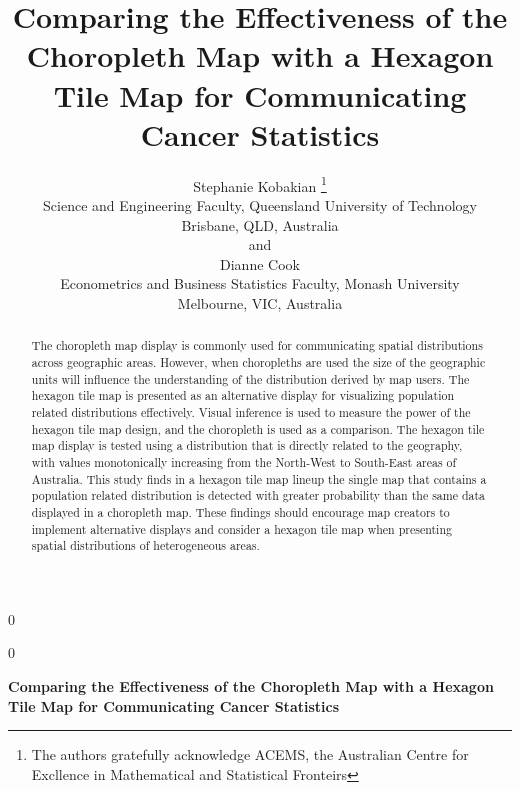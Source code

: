 \documentclass[12pt]{article}
\newcommand{\blind}{0}
\begin{document}
\def\spacingset#1{\renewcommand{\baselinestretch}%
{#1}\small\normalsize} \spacingset{1}



\blind
{
  \title{\bf Comparing the Effectiveness of the Choropleth Map with a
Hexagon Tile Map for Communicating Cancer Statistics}

  \author{
        Stephanie Kobakian \thanks{The authors gratefully acknowledge
ACEMS, the Australian Centre for Excllence in Mathematical and
Statistical Fronteirs} \\
    Science and Engineering Faculty, Queensland University of
Technology\\
Brisbane, QLD, Australia\\
     and \\     Dianne Cook \\
    Econometrics and Business Statistics Faculty, Monash University\\
Melbourne, VIC, Australia\\
      }
  \maketitle
} \fi

\blind
{
  \bigskip
  \bigskip
  \bigskip
  \begin{center}
    {\LARGE\bf Comparing the Effectiveness of the Choropleth Map with a
Hexagon Tile Map for Communicating Cancer Statistics}
  \end{center}
  \medskip
} \fi

\bigskip
\begin{abstract}
The choropleth map display is commonly used for communicating spatial
distributions across geographic areas. However, when choropleths are
used the size of the geographic units will influence the understanding
of the distribution derived by map users. The hexagon tile map is
presented as an alternative display for visualizing population related
distributions effectively. Visual inference is used to measure the power
of the hexagon tile map design, and the choropleth is used as a
comparison. The hexagon tile map display is tested using a distribution
that is directly related to the geography, with values monotonically
increasing from the North-West to South-East areas of Australia. This
study finds in a hexagon tile map lineup the single map that contains a
population related distribution is detected with greater probability
than the same data displayed in a choropleth map. These findings should
encourage map creators to implement alternative displays and consider a
hexagon tile map when presenting spatial distributions of heterogeneous
areas.
\end{abstract}
\end{document}
